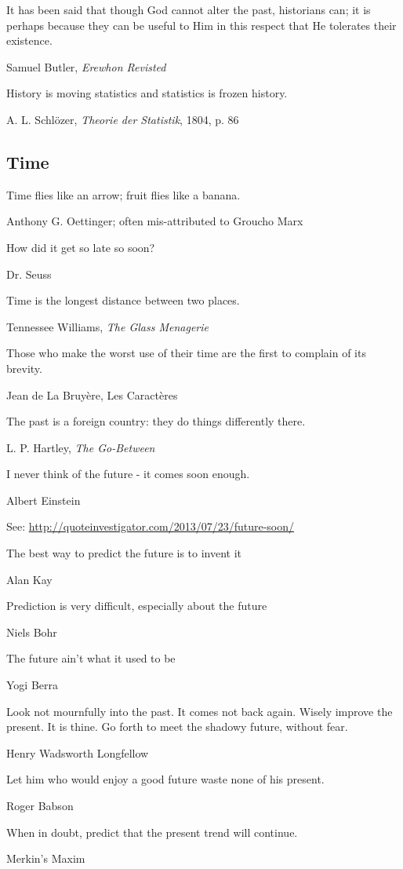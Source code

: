 \epigraph{It has been said that though God cannot alter the past, historians can; it is perhaps because they can be useful to Him in this respect that He tolerates their existence.}{Samuel Butler, \emph{Erewhon Revisted}}

\epigraph{History is moving statistics and statistics is frozen history.}{A. L. Schl\"ozer, \emph{Theorie der Statistik}, 1804, p. 86}


\subsection{Time}

\epigraph{Time flies like an arrow; fruit flies like a banana.}{Anthony G. Oettinger; often mis-attributed to Groucho Marx}

\epigraph{How did it get so late so soon? }{Dr. Seuss}

\epigraph{Time is the longest distance between two places.}{Tennessee Williams, \emph{The Glass Menagerie}}

\epigraph{Those who make the worst use of their time are the first to complain of its brevity.}{Jean de La Bruy\`ere, Les Caract\`eres }


\epigraph{The past is a foreign country: they do things differently there.}{L. P. Hartley, \emph{The Go-Between}}

\epigraph{I never think of the future - it comes soon enough.}{Albert Einstein}
See: \url{http://quoteinvestigator.com/2013/07/23/future-soon/}

\epigraph{The best way to predict the future is to invent it}{Alan Kay}

\epigraph{Prediction is very difficult, especially about the future}{Niels Bohr}

\epigraph{The future ain't what it used to be}{Yogi Berra}

\epigraph{Look not mournfully into the past. It comes not back again.  Wisely improve the present. It is thine. Go forth to meet the shadowy future, without fear.}{Henry Wadsworth Longfellow} %

\epigraph{Let him who would enjoy a good future waste none of his present.}{Roger Babson}

\epigraph{When in doubt, predict that the present trend will continue.}{Merkin's Maxim}

